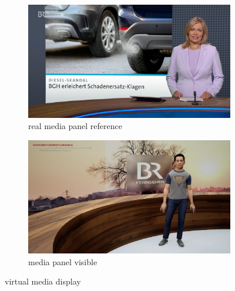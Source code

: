 \documentclass[
  a4paper,  %
  twoside,  %
  bibliography=totoc,
  headsepline,
  cleardoublepage=empty,
  parskip=half,
  draft=false
]{scrbook}
\begin{document}
\begin{figure}[h]
  \centering
  \begin{subfigure}{0.45\textwidth}
    \includegraphics[width=\linewidth]{graphics/unreal-engine/media/slide-real.png}
    \caption{real media panel reference}
  \end{subfigure}
  \begin{subfigure}{0.45\textwidth}
    \includegraphics[width=\linewidth]{graphics/unreal-engine/media/slide-inplace.png}
    \caption{media panel visible}
  \end{subfigure}
  \caption{virtual media display}
  \label{fig:ue-media}
\end{figure}
\end{document}
